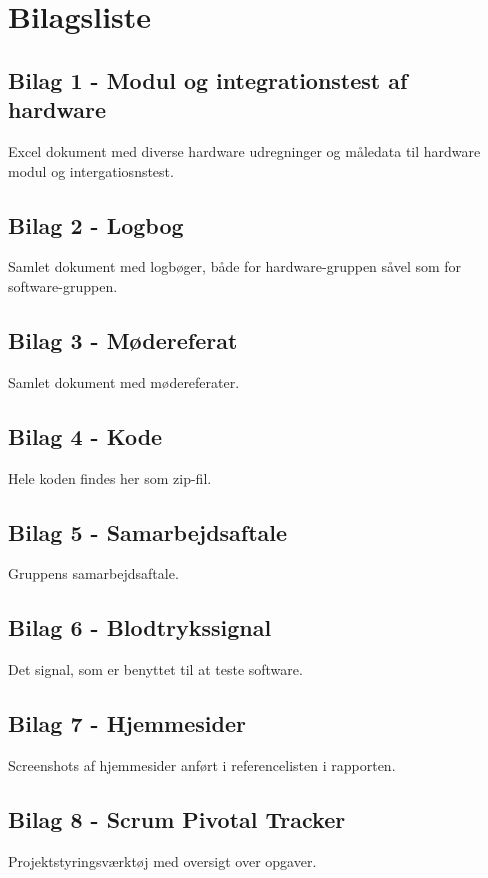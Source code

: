 \chapter{Bilagsliste}

\section{Bilag 1 - Modul og integrationstest af hardware}\label{Modul og integration}
Excel dokument med diverse hardware udregninger og måledata til hardware modul og intergatiosnstest.

\section{Bilag 2 - Logbog}\label{Logbog}
Samlet dokument med logbøger, både for hardware-gruppen såvel som for software-gruppen.

\section{Bilag 3 - Mødereferat}\label{Moedereferart}
Samlet dokument med mødereferater.

\section{Bilag 4 - Kode}\label{Kode}
Hele koden findes her som zip-fil.

\section{Bilag 5 - Samarbejdsaftale}\label{Samarbejdsaftale}
Gruppens samarbejdsaftale.

\section{Bilag 6 - Blodtrykssignal}\label{blodtrykssignal}
Det signal, som er benyttet til at teste software.

\section{Bilag 7 - Hjemmesider}\label{Hjemmesider}
Screenshots af hjemmesider anført i referencelisten i rapporten.

\section{Bilag 8 - Scrum Pivotal Tracker}
Projektstyringsværktøj med oversigt over opgaver.

